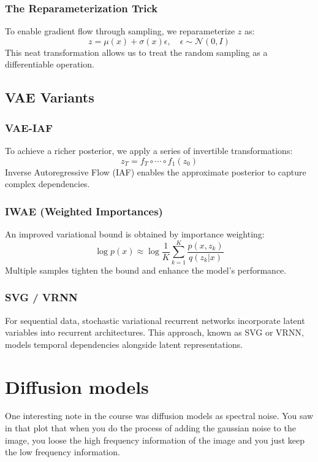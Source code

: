 \documentclass{article}
\begin{document}
\subsubsection{The Reparameterization Trick}
To enable gradient flow through sampling, we reparameterize \(z\) as:
\[
z = \mu(x) + \sigma(x)\epsilon, \quad \epsilon \sim \mathcal{N}(0, I)
\]
This neat transformation allows us to treat the random sampling as a differentiable operation.

\subsection{VAE Variants}

\subsubsection{VAE-IAF}
To achieve a richer posterior, we apply a series of invertible transformations:
\[
z_T = f_T \circ \cdots \circ f_1(z_0)
\]
Inverse Autoregressive Flow (IAF) enables the approximate posterior to capture complex dependencies.

\subsubsection{IWAE (Weighted Importances)}
An improved variational bound is obtained by importance weighting:
\[
\log p(x) \approx \log \frac{1}{K} \sum_{k=1}^{K} \frac{p(x,z_k)}{q(z_k|x)}
\]
Multiple samples tighten the bound and enhance the model's performance.

\subsubsection{SVG / VRNN }
For sequential data, stochastic variational recurrent networks incorporate latent variables into recurrent architectures. This approach, known as SVG or VRNN, models temporal dependencies alongside latent representations.

\clearpage\newpage

\section{Diffusion models}


One interesting note in the course was diffusion models as spectral noise. You saw in that plot that when you do the process of adding the gaussian noise to the image, you loose the high frequency information of the image and you just keep the low frequency information.
\end{document}
